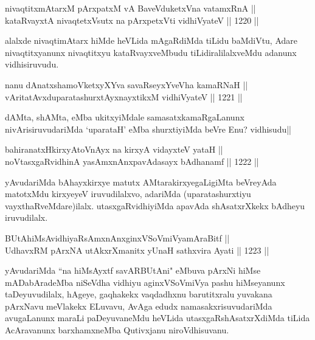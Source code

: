 \begin{shl}
nivaqtitxmAtarxM pArxpatxM vA BaveVduketxVna vatamxRnA || \\
kataRvayxtA nivaqtetxVsutx na pArxpetxVti vidhiVyateV \hfill || 1220 ||  
\end{shl}

\begin{artha}
alalxde nivaqtimAtarx hiMde heVLida mAgaRdiMda tiLidu baMdiVtu, Adare nivaqtitxyanunx nivaqtitxyu kataRvayxveMbudu tiLidiralilalxveMdu adanunx vidhisiruvudu.
\end{artha}


\begin{shl}
nanu dAnatxshamoVketxyXYva savaRseyxYveVha kamaRNaH || \\
vAritatAvxduparatashurxtAyx\s nayxtikxM vidhiVyateV \hfill || 1221 ||  
\end{shl}

\begin{artha}
dAMta, shAMta, eMba ukitxyiMdale samasatxkamaRgaLanunx nivArisiruvudariMda `uparataH' eMba shurxtiyiMda beVre Enu? vidhisudu||
\end{artha}

\begin{shl}
bahiranatxHkirxyAtoV\s nAyx na kirxyA vidayxteV yataH || \\
noVtasxgaRvidhinA yasAmxnAnxpavAdasayx bAdhanamf \hfill || 1222 ||  
\end{shl}

\begin{artha}
yAvudariMda bAhayxkirxye matutx AMtarakirxyegaLigiMta beVreyAda matotxMdu kirxyeyeV iruvudilalxvo, adariMda (uparatashurxtiyu vayxthaRveMdare)ilalx. utasxgaRvidhiyiMda apavAda shAsatxrXkekx bAdheyu iruvudilalx.
\end{artha}


\begin{shl}
BUtAhiMsAvidhiyaRsAmxnAnxginxVSoVmiVyamAraBitf || \\
UdhavxRM pArxNA utAkxrXmanitx yUnaH sathxvira Ayati \hfill || 1223 ||  
\end{shl}

\begin{artha}
yAvudariMda ``na hiMsAyxtf savARBUtAni" eMbuva pArxNi hiMse mADabAradeMba niSeVdha vidhiyu aginxVSoVmiVya pashu hiMseyanunx taDeyuvudilalx, hAgeye, gaqhakekx vaqdadhxnu barutitxralu yuvakana pArxNavu meVlakekx ELuvavu, AvAga edudx namasakxrisuvudariMda avugaLanunx maraLi paDeyuvaneMdu heVLida utasxgaRshAsatxrXdiMda tiLida AcAravanunx barxhamxneMba Qutivxjanu niroVdhisuvanu.
\end{artha}

